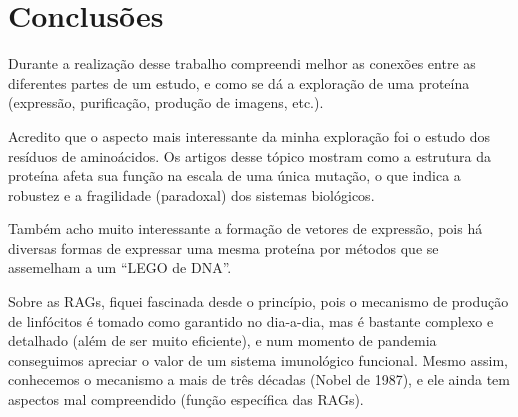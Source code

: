 \documentclass[
	12pt,				%
	openright,			%
	twoside,			%
	a4paper,			%
	]{abntex2}
\begin{document}
\chapter{Conclusões}

Durante a realização desse trabalho compreendi melhor as conexões entre as diferentes partes de um estudo, e como se dá a exploração de uma proteína (expressão, purificação, produção de imagens, etc.).

Acredito que o aspecto mais interessante da minha exploração foi o estudo dos resíduos de aminoácidos. Os artigos desse tópico mostram como a estrutura da proteína afeta sua função na escala de uma única mutação, o que indica a robustez e a fragilidade (paradoxal) dos sistemas biológicos.

Também acho muito interessante a formação de vetores de expressão, pois há diversas formas de expressar uma mesma proteína por métodos que se assemelham a um ``LEGO de DNA''.

Sobre as RAGs, fiquei fascinada desde o princípio, pois o mecanismo de produção de linfócitos é tomado como garantido no dia-a-dia, mas é bastante complexo e detalhado (além de ser muito eficiente), e num momento de pandemia conseguimos apreciar o valor de um sistema imunológico funcional. Mesmo assim, conhecemos o mecanismo a mais de três décadas (Nobel de 1987), e ele ainda tem aspectos mal compreendido (função específica das RAGs).

\postextual



%
%


%
%
%
%
%
\end{document}

